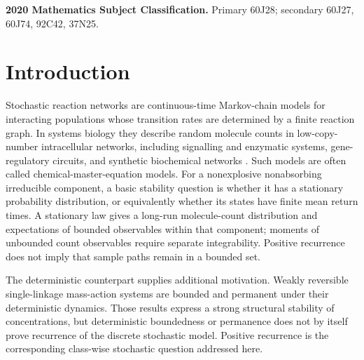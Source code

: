 \medskip
\noindent\textbf{2020 Mathematics Subject Classification.}
Primary 60J28; secondary 60J27, 60J74, 92C42, 37N25.

\section{Introduction}\label{sec:intro}

Stochastic reaction networks are continuous-time Markov-chain models for
interacting populations whose transition rates are determined by a finite
reaction graph.  In systems biology they describe random molecule counts in
low-copy-number intracellular networks, including signalling and enzymatic
systems, gene-regulatory circuits, and synthetic biochemical networks
\citep{AndersonKurtz2015}.  Such models are often called chemical-master-equation
models.  For a nonexplosive nonabsorbing irreducible component, a basic
stability question
is whether it has a stationary probability distribution, or equivalently
whether its states have finite mean return times.  A stationary law gives a
long-run molecule-count distribution and expectations of bounded observables
within that component; moments of unbounded count observables require separate
integrability.  Positive recurrence does not imply that sample paths remain
in a bounded set.

The deterministic counterpart supplies additional motivation.  Weakly
reversible single-linkage mass-action systems are bounded
\citep{Anderson2011Boundedness} and permanent \citep{BorosHofbauer2020} under
their deterministic dynamics.  Those results express a strong structural
stability of concentrations, but deterministic boundedness or permanence does
not by itself prove recurrence of the discrete stochastic model.  Positive
recurrence is the corresponding class-wise stochastic question addressed
here.

